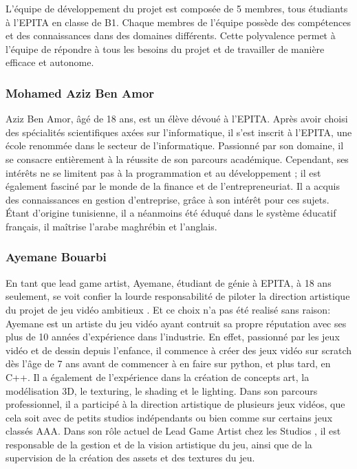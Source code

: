 

L'équipe de développement du projet est composée de 5 membres, tous étudiants à l'EPITA en classe de B1.
Chaque membres de l'équipe possède des compétences et des connaissances dans des domaines différents.
Cette polyvalence permet à l'équipe de répondre à tous les besoins du projet et de travailler de manière efficace et autonome.


\subsubsection*{Mohamed Aziz Ben Amor}

Aziz Ben Amor, âgé de 18 ans, est un élève dévoué à l'EPITA. 
Après avoir choisi des spécialités scientifiques axées sur l'informatique, il s'est inscrit à l'EPITA, une école renommée dans le secteur de l'informatique. 
Passionné par son domaine, il se consacre entièrement à la réussite de son parcours académique.
Cependant, ses intérêts ne se limitent pas à la programmation et au développement ; il est également fasciné par le monde de la finance et de l'entrepreneuriat. 
Il a acquis des connaissances en gestion d'entreprise, grâce à son intérêt pour ces sujets. 
Étant d'origine tunisienne, il a néanmoins été éduqué dans le système éducatif français, il maîtrise l'arabe maghrébin et l'anglais. 



\subsubsection*{Ayemane Bouarbi}

En tant que lead game artist, Ayemane, étudiant de génie à EPITA, à 18 ans seulement, se voit confier la lourde responsabilité de piloter la direction artistique du projet de jeu vidéo ambitieux \textit{\gameName}. 
Et ce choix n’a pas été realisé sans raison: Ayemane est un artiste du jeu vidéo ayant contruit sa propre réputation avec ses plus de 10 années d'expérience dans l’industrie. 
En effet, passionné par les jeux vidéo et de dessin depuis l’enfance, il commence à créer des jeux vidéo sur scratch dès l'âge de 7 ans avant de commencer à en faire sur python, et plus tard, en C++. 
Il a également de l’expérience dans la création de concepts art, la modélisation 3D, le texturing, le shading et le lighting.
Dans son parcours professionnel, il a participé à la direction artistique de plusieurs jeux vidéos, que cela soit avec de petits studios indépendants ou bien comme sur certains jeux classés AAA.
Dans son rôle actuel de Lead Game Artist chez les Studios \textit{\companyName}, il est responsable de la gestion et de la vision artistique du jeu, ainsi que de la  supervision de la création des assets et des textures du jeu.

